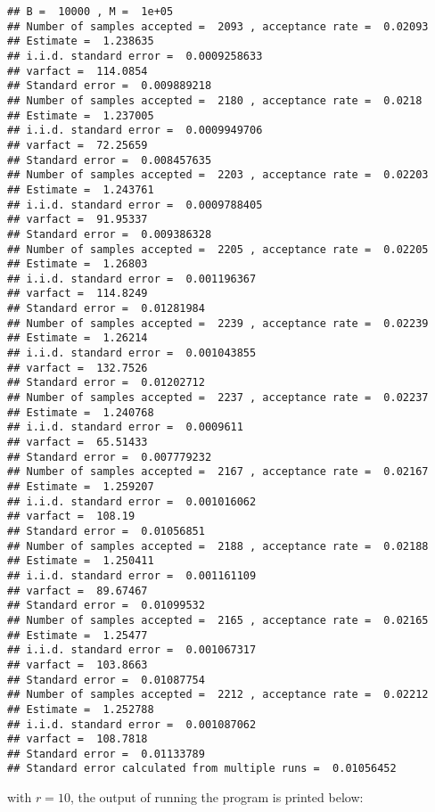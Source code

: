 \begin{knitrout}
\color{fgcolor}\begin{kframe}
\begin{verbatim}
## B =  10000 , M =  1e+05
## Number of samples accepted =  2093 , acceptance rate =  0.02093 
## Estimate =  1.238635 
## i.i.d. standard error =  0.0009258633 
## varfact =  114.0854 
## Standard error =  0.009889218 
## Number of samples accepted =  2180 , acceptance rate =  0.0218 
## Estimate =  1.237005 
## i.i.d. standard error =  0.0009949706 
## varfact =  72.25659 
## Standard error =  0.008457635 
## Number of samples accepted =  2203 , acceptance rate =  0.02203 
## Estimate =  1.243761 
## i.i.d. standard error =  0.0009788405 
## varfact =  91.95337 
## Standard error =  0.009386328 
## Number of samples accepted =  2205 , acceptance rate =  0.02205 
## Estimate =  1.26803 
## i.i.d. standard error =  0.001196367 
## varfact =  114.8249 
## Standard error =  0.01281984 
## Number of samples accepted =  2239 , acceptance rate =  0.02239 
## Estimate =  1.26214 
## i.i.d. standard error =  0.001043855 
## varfact =  132.7526 
## Standard error =  0.01202712 
## Number of samples accepted =  2237 , acceptance rate =  0.02237 
## Estimate =  1.240768 
## i.i.d. standard error =  0.0009611 
## varfact =  65.51433 
## Standard error =  0.007779232 
## Number of samples accepted =  2167 , acceptance rate =  0.02167 
## Estimate =  1.259207 
## i.i.d. standard error =  0.001016062 
## varfact =  108.19 
## Standard error =  0.01056851 
## Number of samples accepted =  2188 , acceptance rate =  0.02188 
## Estimate =  1.250411 
## i.i.d. standard error =  0.001161109 
## varfact =  89.67467 
## Standard error =  0.01099532 
## Number of samples accepted =  2165 , acceptance rate =  0.02165 
## Estimate =  1.25477 
## i.i.d. standard error =  0.001067317 
## varfact =  103.8663 
## Standard error =  0.01087754 
## Number of samples accepted =  2212 , acceptance rate =  0.02212 
## Estimate =  1.252788 
## i.i.d. standard error =  0.001087062 
## varfact =  108.7818 
## Standard error =  0.01133789
## Standard error calculated from multiple runs =  0.01056452
\end{verbatim}
\end{kframe}
\end{knitrout}



with $r=10$, the output of running the program is printed below:

